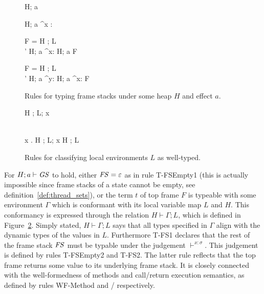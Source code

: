 \begin{figure}
  {H; a \vdash \varepsilon}

  \RuleSpace{}

  {H; a \vdash^{x : \sigma} \varepsilon}

  \RuleSpace{}

  { F =  \andalso H \vdash \Gamma; L \\
   \andalso \sigma' \stof \sigma \andalso H; a \vdash^{x: \sigma} \FS }
  { H; a \vdash F \circ \FS }
  
  \RuleSpace{}

  { F =  \andalso H \vdash \Gamma; L \\
   \andalso \sigma' \stof \sigma 
  \andalso H; a \vdash^{y: \sigma} \FS }
  { H; a \vdash^{x: \tau} F \circ \FS }

  \caption{Rules for typing frame stacks under some heap $H$ and effect $a$.}
  \label{fig:fs_typing}
\end{figure}

\begin{figure}
  {}
  { H \vdash \Gamma; L; x }

  \RuleSpace{}

  {\dom{(\Gamma)} \subseteq {} \\
    \forall x \in \dom{(\Gamma)}. \: H \vdash \Gamma; L; x 
  }
  { H \vdash \Gamma; L }

  \caption{Rules for classifying local environments $L$ as well-typed.}
  \label{fig:local_typing}
\end{figure}

For $H; a \vdash \mathit{GS}$ to hold, either $\mathit{FS} = \varepsilon$ as in rule {\sc
T-FSEmpty1} (this is actually impossible since frame stacks of a state cannot be
empty, see definition~\ref{def:thread_sets}), or the term $t$ of top frame $F$
is typeable with some environment $\Gamma$ which is conformant with its local
variable map $L$ and $H$. This conformancy is expressed through the relation $H
\vdash \Gamma; L$, which is defined in Figure~\ref{fig:local_typing}. Simply
stated, $H \vdash \Gamma;L$ says that all types specified in $\Gamma$ align
with the dynamic types of the values in $L$. Furthermore {\sc T-FS1} declares
that the rest of the frame stack $\mathit{FS}$ must be typable under the judgement
$\vdash^{x: \sigma}$. This judgement is defined by rules {\sc T-FSEmpty2} and
{\sc T-FS2}. The latter rule reflects that the top frame returns some value to its
underlying frame stack. It is closely connected with the well-formedness of
methods and call\slash return execution semantics, as defined by rules {\sc
WF-Method} and \ECall{}\slash\ERet{} respectively.

